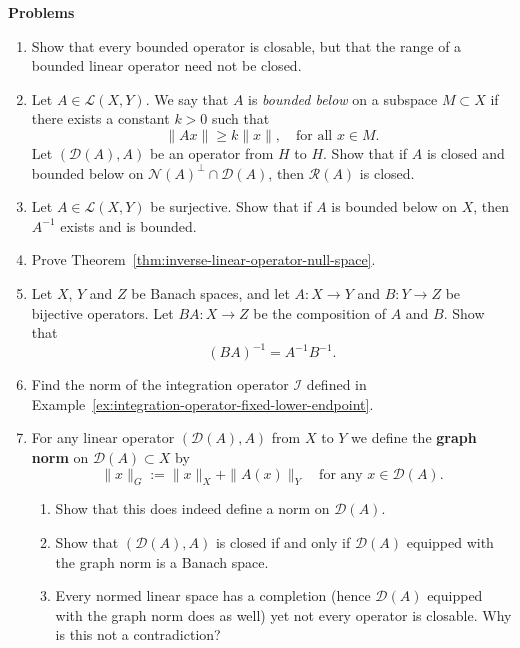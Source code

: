 \textbf{Problems}

\begin{enumerate}[label=\thesection.\arabic*.,ref=\thesection.\arabic*,start=1,series=book-problems]

\item\label{ex:bounded-operator-closable-nonclosed-range} Show that every bounded operator is closable, but that the range of a bounded linear operator need not be closed.

\item\label{ex:closed-bounded-below-operator-closed-range} Let $A\in\mathcal{L}(X,Y)$. We say that $A$ is \emph{bounded below} on a subspace $M\subset X$ if there exists a constant $k>0$ such that\[\|Ax\|\geq k\|x\|,\quad\text{for all }x\in M.\]Let $(\mathcal{D}(A),A)$ be an operator from $H$ to $H$. Show that if $A$ is closed and bounded below on $\mathcal{N}(A)^\perp\cap\mathcal{D}(A)$, then $\mathcal{R}(A)$ is closed.

\item\label{ex:surjective-bounded-below-inverse} Let $A\in\mathcal{L}(X,Y)$ be surjective. Show that if $A$ is bounded below on $X$, then $A^{-1}$ exists and is bounded.

\item\label{ex:inverse-linear-operator-null-space-criterion} Prove Theorem~\ref{thm:inverse-linear-operator-null-space}.

\item\label{ex:composition-bijective-operators-inverse} Let $X$, $Y$ and $Z$ be Banach spaces, and let $A:X\to Y$ and $B:Y\to Z$ be bijective operators. Let $BA:X\to Z$ be the composition of $A$ and $B$. Show that\[(BA)^{-1}=A^{-1}B^{-1}.\]

\item\label{ex:integration-operator-supremum-norm} Find the norm of the integration operator $\mathcal{I}$ defined in Example~\ref{ex:integration-operator-fixed-lower-endpoint}.

\item\label{ex:operator-graph-norm-completeness} For any linear operator $(\mathcal{D}(A),A)$ from $X$ to $Y$ we define the \textbf{graph norm} on $\mathcal{D}(A)\subset X$ by\[\|x\|_G:=\|x\|_X+\|A(x)\|_Y\quad\text{for any }x\in\mathcal{D}(A).\]\begin{enumerate}[label=(\alph*)]\item Show that this does indeed define a norm on $\mathcal{D}(A)$.\item Show that $(\mathcal{D}(A),A)$ is closed if and only if $\mathcal{D}(A)$ equipped with the graph norm is a Banach space.\item Every normed linear space has a completion (hence $\mathcal{D}(A)$ equipped with the graph norm does as well) yet not every operator is closable. Why is this not a contradiction?\end{enumerate}


\end{enumerate}
